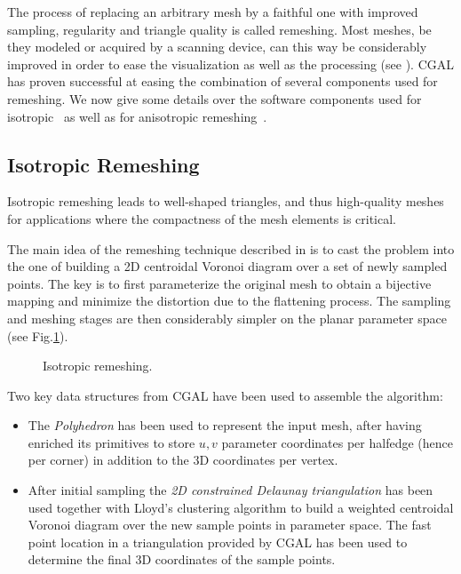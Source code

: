 \label{sec:remeshing}


The process of replacing an arbitrary mesh by a faithful one with
improved sampling, regularity and triangle quality is called
remeshing. Most meshes, be they modeled or acquired by a scanning
device, can this way be considerably improved in order to ease the
visualization as well as the processing (see \cite{ss-dgp-01}). CGAL
has proven successful at easing the combination of several components
used for remeshing. We now give some details over the software
components used for isotropic~\cite{acdi-isr-03} as well as for
anisotropic remeshing~\cite{acdld-apr-03}.

\subsection{Isotropic Remeshing}


Isotropic remeshing leads to well-shaped triangles, and thus
high-quality meshes for applications where the compactness of the mesh
elements is critical.


The main idea of the remeshing technique described in
\cite{acdi-isr-03} is to cast the problem into the
one of building a 2D centroidal Voronoi diagram over a set of newly
sampled points. The key is to first parameterize the original mesh to
obtain a bijective mapping and minimize the distortion due to the
flattening process. The sampling and meshing stages are then
considerably simpler on the planar parameter space (see
Fig.\ref{fig:isotropic}).

\begin{figure}
  \centering
  \caption{Isotropic remeshing.}
  \label{fig:isotropic}
\end{figure}



Two key data structures from CGAL have been used to assemble the
algorithm:

\begin{itemize}

\item 
The \emph{Polyhedron} has been used to represent the input mesh, after
having enriched its primitives to store $u,v$ parameter coordinates
per halfedge (hence per corner) in addition to the 3D coordinates per
vertex.

\item 
After initial sampling the \emph{2D constrained Delaunay
triangulation} has been used together with Lloyd's clustering
algorithm to build a weighted centroidal Voronoi diagram over the new
sample points in parameter space. The fast point location in a
triangulation provided by CGAL has been used to determine the final 3D
coordinates of the sample points.

\end{itemize}

